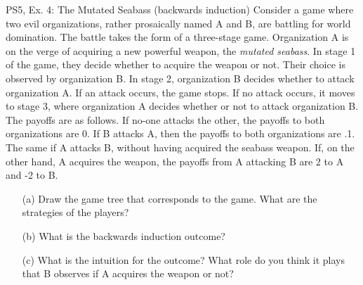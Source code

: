 \begin{frame}{PS5, Ex. 4: The Mutated Seabass (backwards induction)}
    Consider a game where two evil organizations, rather prosaically named A and B, are battling for world domination. The battle takes the form of a three-stage game. Organization A is on the verge of acquiring a new powerful weapon, the \textit{mutated seabass}. In stage 1 of the game, they decide whether to acquire the weapon or not. Their choice is observed by organization B. In stage 2, organization B decides whether to attack organization A. If an attack occurs, the game stops. If no attack occurs, it moves to stage 3, where organization A decides whether or not to attack organization B. The payoffs are as follows. If no-one attacks the other, the payoffs to both organizations are 0. If B attacks A, then the payoffs to both organizations are .1. The same if A attacks B, without having acquired the seabass weapon. If, on the other hand, A acquires the weapon, the payoffs from A attacking B are 2 to A and -2 to B.
    \begin{itemize}
      \item[(a)] Draw the game tree that corresponds to the game. What are the strategies of the players?
      \item[(b)] What is the backwards induction outcome?
      \item[(c)] What is the intuition for the outcome? What role do you think it plays that B observes if A acquires the weapon or not?
    \end{itemize}
  \vfill\null
\end{frame}

